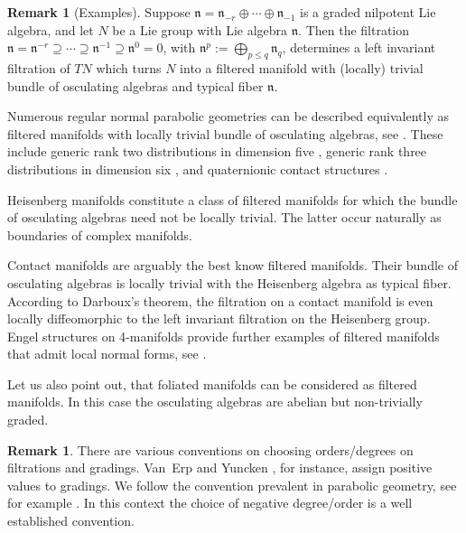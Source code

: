 \documentclass[reqno,12pt]{amsart}
\newcommand\noe{\mathfrak n}
\theoremstyle{plain}
\theoremstyle{definition}
\newtheorem{remark}[theorem]{Remark}
\begin{document}
\begin{remark}[Examples]
Suppose $\noe=\noe_{-r}\oplus\cdots\oplus\noe_{-1}$ is a graded nilpotent Lie algebra, and let $N$ be a Lie group with Lie algebra $\noe$.
Then the filtration $\noe=\noe^{-r}\supseteq\cdots\supseteq\noe^{-1}\supseteq\noe^0=0$, with $\noe^p:=\bigoplus_{p\leq q}\noe_q$, determines a left invariant filtration of $TN$ which turns $N$ into a filtered manifold with (locally) trivial bundle of osculating algebras and typical fiber $\noe$.

Numerous regular normal parabolic geometries can be described equivalently as filtered manifolds with locally trivial bundle of osculating algebras, see \cite[Proposition~4.3.1]{CS09}.
These include generic rank two distributions in dimension five \cite{C10,BH93,S08,CS09,DH16}, generic rank three distributions in dimension six \cite{B06}, and quaternionic contact structures \cite{B00}.

Heisenberg manifolds \cite{P08} constitute a class of filtered manifolds for which the bundle of osculating algebras need not be locally trivial.
The latter occur naturally as boundaries of complex manifolds.

Contact manifolds are arguably the best know filtered manifolds.
Their bundle of osculating algebras is locally trivial with the Heisenberg algebra as typical fiber.
According to Darboux's theorem, the filtration on a contact manifold is even locally diffeomorphic to the left invariant filtration on the Heisenberg group.
Engel structures on 4-manifolds provide further examples of filtered manifolds that admit local normal forms, see \cite{V09}.

Let us also point out, that foliated manifolds can be considered as filtered manifolds.
In this case the osculating algebras are abelian but non-trivially graded.
\end{remark}


\begin{remark}
There are various conventions on choosing orders/degrees on filtrations and gradings.
Van~Erp and Yuncken \cite{EY15}, for instance, assign positive values to gradings.
We follow the convention prevalent in parabolic geometry, see for example \cite{CS09,M93}.
In this context the choice of negative degree/order is a well established convention.
\end{remark}
\end{document}
